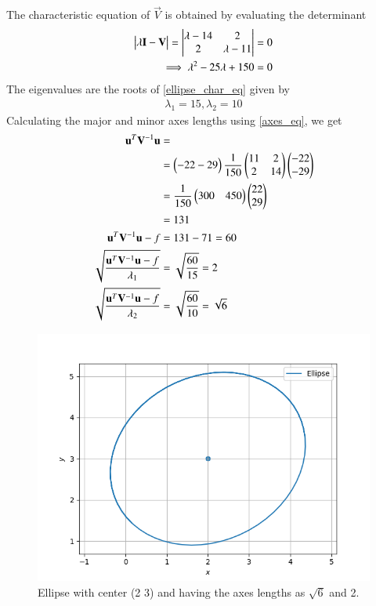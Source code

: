 \documentclass[journal,12pt,twocolumn]{IEEEtran}
\begin{document}
The characteristic equation of $\vec{V}$ is obtained by evaluating the determinant
\begin{align}
\begin{vmatrix}\lambda \mathbf{I}-\mathbf{V}\end{vmatrix} = \begin{vmatrix}\lambda -14 & 2 \\ 2 & \lambda -11\end{vmatrix} &= 0
\\
\implies \lambda^2 - 25\lambda + 150 &= 0
\label{ellipse_char_eq}
\end{align}
The eigenvalues are the roots of \eqref{ellipse_char_eq} given by
\begin{align}
\lambda_1 = 15, \lambda_2 = 10
\label{ellipse_eval_eq}
\end{align}
Calculating the major and minor axes lengths using \eqref{axes_eq}, we get
\begin{align}
\mathbf{u}^T\mathbf{V}^{-1}\mathbf{u} &= \nonumber \\
&= \begin{pmatrix}-22 -29\end{pmatrix}\frac{1}{150}\begin{pmatrix}11 & 2 \\ 2 &1 4 \end{pmatrix}\begin{pmatrix}-22 \\ -29\end{pmatrix} \nonumber \\
&= \frac{1}{150}\begin{pmatrix}300 & 450\end{pmatrix}\begin{pmatrix}22 \\ 29\end{pmatrix} \nonumber \\
&= 131 \nonumber \\
\mathbf{u}^T\mathbf{V}^{-1}\mathbf{u} -f &= 131 - 71 = 60 \\
\sqrt{\frac{\mathbf{u}^T\mathbf{V}^{-1}\mathbf{u} -f}{\lambda_1}} &= \sqrt{\frac{60}{15}} = 2 \\
\sqrt{\frac{\mathbf{u}^T\mathbf{V}^{-1}\mathbf{u} -f}{\lambda_2}} &= \sqrt{\frac{60}{10}} = \sqrt{6}
\end{align}

\begin{figure}[!ht]
\centering
\includegraphics[width=\columnwidth]{assignment_6_fig.png}
\caption{Ellipse with center (2 3) and having the axes lengths as $\sqrt{6}$ and 2.}
\label{Fig:Circle}
\end{figure}
\end{document}
